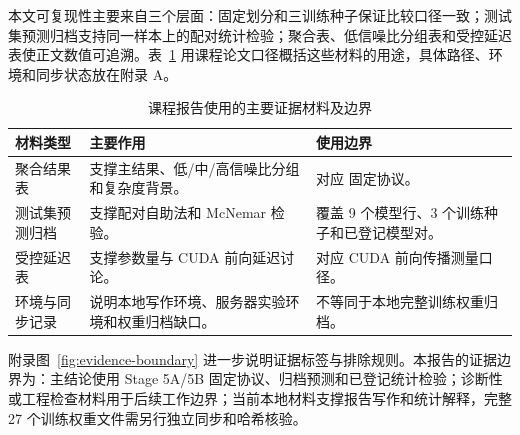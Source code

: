 本文可复现性主要来自三个层面：固定划分和三训练种子保证比较口径一致；测试集预测归档支持同一样本上的配对统计检验；聚合表、低信噪比分组表和受控延迟表使正文数值可追溯。表~\ref{tab:course-artifact-boundary} 用课程论文口径概括这些材料的用途，具体路径、环境和同步状态放在附录 A。

\begin{table}[htbp]
  \centering
  \caption{课程报告使用的主要证据材料及边界}
  \label{tab:course-artifact-boundary}
  \begin{tabularx}{\textwidth}{lXX}
    \toprule
    材料类型 & 主要作用 & 使用边界 \\
    \midrule
    聚合结果表 & 支撑主结果、低/中/高信噪比分组和复杂度背景。 & 对应 \datasetname{} 固定协议。 \\
    测试集预测归档 & 支撑配对自助法和 McNemar 检验。 & 覆盖 9 个模型行、3 个训练种子和已登记模型对。 \\
    受控延迟表 & 支撑参数量与 CUDA 前向延迟讨论。 & 对应 CUDA 前向传播测量口径。 \\
    环境与同步记录 & 说明本地写作环境、服务器实验环境和权重归档缺口。 & 不等同于本地完整训练权重归档。 \\
    \bottomrule
  \end{tabularx}
\end{table}

附录图~\ref{fig:evidence-boundary} 进一步说明证据标签与排除规则。本报告的证据边界为：主结论使用 Stage 5A/5B 固定协议、归档预测和已登记统计检验；诊断性或工程检查材料用于后续工作边界；当前本地材料支撑报告写作和统计解释，完整 27 个训练权重文件需另行独立同步和哈希核验。
